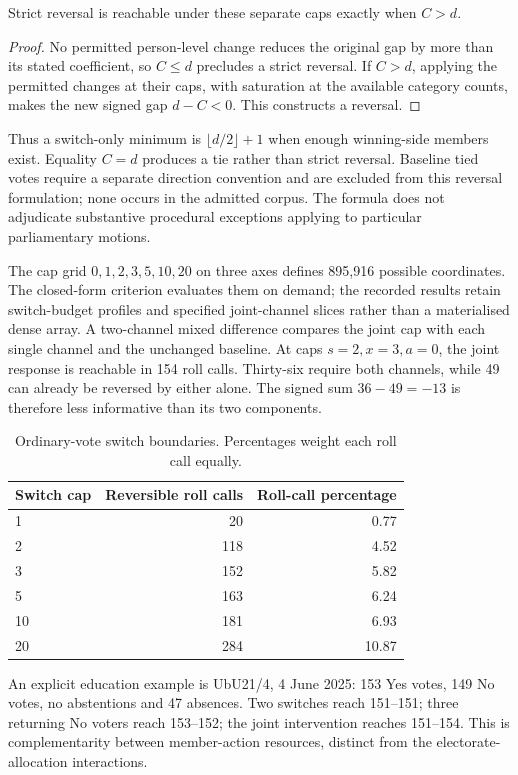 \begin{proposition}\label{prop:reversal}
Strict reversal is reachable under these separate caps exactly when \(C>d\).
\end{proposition}
\begin{proof}
No permitted person-level change reduces the original gap by more than its stated coefficient, so \(C\le d\) precludes a strict reversal. If \(C>d\), applying the permitted changes at their caps, with saturation at the available category counts, makes the new signed gap \(d-C<0\). This constructs a reversal.
\end{proof}

Thus a switch-only minimum is \(\lfloor d/2\rfloor+1\) when enough winning-side members exist. Equality \(C=d\) produces a tie rather than strict reversal. Baseline tied votes require a separate direction convention and are excluded from this reversal formulation; none occurs in the admitted corpus. The formula does not adjudicate substantive procedural exceptions applying to particular parliamentary motions.

The cap grid \(0,1,2,3,5,10,20\) on three axes defines 895,916 possible coordinates. The closed-form criterion evaluates them on demand; the recorded results retain switch-budget profiles and specified joint-channel slices rather than a materialised dense array. A two-channel mixed difference compares the joint cap with each single channel and the unchanged baseline. At caps \(s=2,x=3,a=0\), the joint response is reachable in 154 roll calls. Thirty-six require both channels, while 49 can already be reversed by either alone. The signed sum \(36-49=-13\) is therefore less informative than its two components.

\begin{table}[htbp]\centering
\caption{Ordinary-vote switch boundaries. Percentages weight each roll call equally.}
\begin{tabular}{lrr}
\toprule
Switch cap & Reversible roll calls & Roll-call percentage\\
\midrule
1&20&0.77\\
2&118&4.52\\
3&152&5.82\\
5&163&6.24\\
10&181&6.93\\
20&284&10.87\\
\bottomrule
\end{tabular}
\end{table}

An explicit education example is UbU21/4, 4 June 2025: 153 Yes votes, 149 No votes, no abstentions and 47 absences. Two switches reach 151--151; three returning No voters reach 153--152; the joint intervention reaches 151--154. This is complementarity between member-action resources, distinct from the electorate-allocation interactions.

